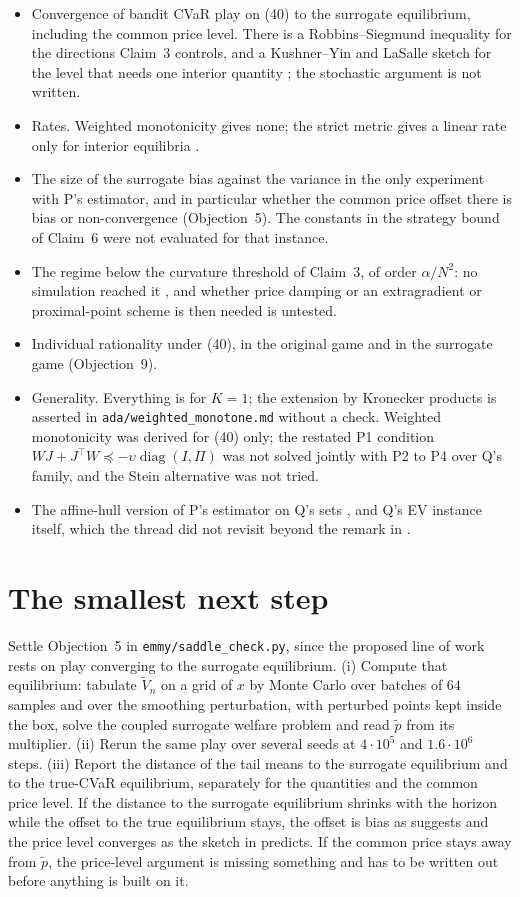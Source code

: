 \documentclass{article}
\begin{document}
\begin{itemize}
\item Convergence of bandit CVaR play on (40) to the surrogate equilibrium, including the common price level. There is a Robbins--Siegmund inequality for the directions Claim~3 controls, and a Kushner--Yin and LaSalle sketch for the level that needs one interior quantity ; the stochastic argument is not written.
\item Rates. Weighted monotonicity gives none; the strict metric gives a linear rate only for interior equilibria .
\item The size of the surrogate bias against the variance in the only experiment with P's estimator, and in particular whether the common price offset there is bias or non-convergence (Objection~5). The constants in the strategy bound of Claim~6 were not evaluated for that instance.
\item The regime below the curvature threshold of Claim~3, of order \(\alpha/N^2\): no simulation reached it , and whether price damping or an extragradient or proximal-point scheme is then needed  is untested.
\item Individual rationality under (40), in the original game and in the surrogate game (Objection~9).
\item Generality. Everything is for \(K=1\); the extension by Kronecker products is asserted in \texttt{ada/weighted\_monotone.md} without a check. Weighted monotonicity was derived for (40) only; the restated P1 condition \(WJ+J^\top W\preceq-\upsilon\operatorname{diag}(I,\Pi)\)  was not solved jointly with P2 to P4 over Q's family, and the Stein alternative  was not tried.
\item The affine-hull version of P's estimator on Q's sets , and Q's EV instance itself, which the thread did not revisit beyond the remark in .
\end{itemize}

\section{The smallest next step}

Settle Objection~5 in \texttt{emmy/saddle\_check.py}, since the proposed line of work  rests on play converging to the surrogate equilibrium. (i) Compute that equilibrium: tabulate \(\widetilde V_n\) on a grid of \(x\) by Monte Carlo over batches of \(64\) samples and over the smoothing perturbation, with perturbed points kept inside the box, solve the coupled surrogate welfare problem and read \(\tilde p\) from its multiplier. (ii) Rerun the same play over several seeds at \(4\cdot10^5\) and \(1.6\cdot10^6\) steps. (iii) Report the distance of the tail means to the surrogate equilibrium and to the true-CVaR equilibrium, separately for the quantities and the common price level. If the distance to the surrogate equilibrium shrinks with the horizon while the offset to the true equilibrium stays, the offset is bias as  suggests and the price level converges as the sketch in  predicts. If the common price stays away from \(\tilde p\), the price-level argument is missing something and has to be written out before anything is built on it.
\end{document}
